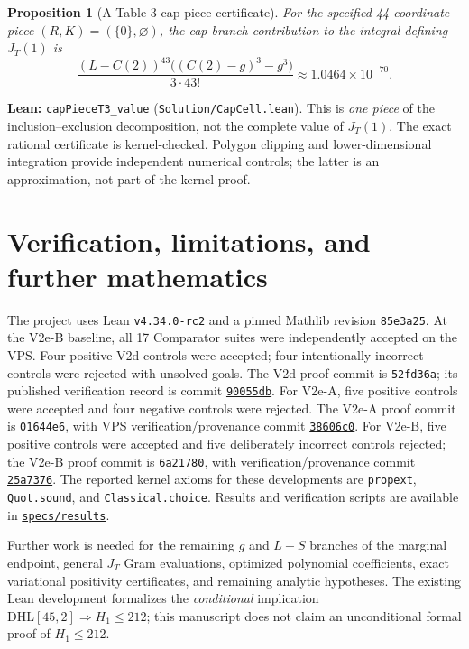 \documentclass[11pt]{article}
\newtheorem{proposition}[theorem]{Proposition}
\newcommand{\JT}{J_T}
\newcommand{\code}[1]{\texttt{#1}}
\begin{document}
\begin{proposition}[A Table 3 cap-piece certificate]\label{prop:capcert}
For the specified 44-coordinate piece $(R,K)=(\{0\},\varnothing)$,
the cap-branch contribution to the integral defining $J_T(1)$ is
\[
 \frac{(L-C(2))^{43}\big((C(2)-g)^3-g^3\big)}{3\cdot43!}
 \approx 1.0464\times 10^{-70}.
\]
\end{proposition}
\noindent\textbf{Lean:} \code{capPieceT3\_value}
(\nolinkurl{Solution/CapCell.lean}). This is \emph{one piece} of the
inclusion--exclusion decomposition, not the complete value of $J_T(1)$.
The exact rational certificate is kernel-checked. Polygon clipping and
lower-dimensional integration provide independent numerical controls;
the latter is an approximation, not part of the kernel proof.

\section{Verification, limitations, and further mathematics}
The project uses Lean \code{v4.34.0-rc2} and a pinned Mathlib revision
\code{85e3a25}. At the V2e-B baseline, all 17 Comparator suites were independently
accepted on the VPS. Four positive V2d controls were accepted; four intentionally
incorrect controls were rejected with unsolved goals. The V2d proof commit is
\code{52fd36a}; its published verification record is commit
\href{https://github.com/thinkthoughts/lean-bgp212/commit/90055db}{\code{90055db}}.
For V2e-A, five positive controls were accepted and four negative controls
were rejected. The V2e-A proof commit is \code{01644e6}, with VPS
verification/provenance commit
\href{https://github.com/thinkthoughts/lean-bgp212/commit/38606c0}{\code{38606c0}}.
For V2e-B, five positive controls were accepted and five deliberately
incorrect controls rejected; the V2e-B proof commit is
\href{https://github.com/thinkthoughts/lean-bgp212/commit/6a21780}{\code{6a21780}},
with verification/provenance commit
\href{https://github.com/thinkthoughts/lean-bgp212/commit/25a7376}{\code{25a7376}}.
The reported kernel axioms for these developments are
\code{propext}, \code{Quot.sound}, and \code{Classical.choice}.
Results and verification scripts are available in
\href{https://github.com/thinkthoughts/lean-bgp212/tree/main/specs/results}{\code{specs/results}}.

Further work is needed for the remaining $g$ and $L-S$ branches of
the marginal endpoint, general $\JT$ Gram evaluations,
optimized polynomial coefficients, exact variational positivity certificates, and
remaining analytic hypotheses. The existing Lean development formalizes the
\emph{conditional} implication $\mathrm{DHL}[45,2]\Rightarrow H_1\le212$;
this manuscript does not claim an unconditional formal proof of $H_1\le212$.
\end{document}
